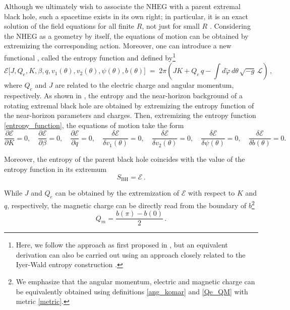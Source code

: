 \documentclass[11pt]{article}
\numberwithin{equation}{section} %
\begin{document}
Although we ultimately wish to associate the NHEG   {with}  a parent extremal black hole, such a spacetime exists   {in its own right;}  in particular, it   {is an exact solution of the field equations}  for all finite   {\(R\)}, not just for small   {\(R\) \cite{Sen:2007qy}}. Considering the NHEG as a geometry by itself, the equations of motion can be obtained by extremizing the corresponding action. Moreover, one can introduce a new functional \cite{Sen:2005iz,Astefanesei:2006dd}, called the entropy function and defined by\footnote{Here, we follow the approach as first proposed in \cite{Sen:2005iz,Astefanesei:2006dd}, but an equivalent derivation can also be carried out using  {an approach closely related to}  the Iyer-Wald entropy construction \cite{Compere:2015mza,Compere:2015bca,Hajian:2013lna}.}
%
\begin{equation}
    \mathcal{E}\!\bigl[J,Q_e,K,\beta,q,
                 v_{1}(\theta),v_{2}(\theta),
                \psi(\theta),b(\theta)\bigr]
  \;=\;
  2\pi\!\left(
          J K
          + Q_e\, q -\int d \tilde{\varphi}\,d \theta\,\sqrt{-g}\,\mathcal{L}
        \right)\,, \label{entropy_function}
 \end{equation}
where $Q_e$ and $J$ are related to the electric charge and angular momentum, respectively. As shown in   {\cite{Astefanesei:2006dd,Sen:2005iz,Astefanesei:2007bf}}, the entropy and the near-horizon background of a rotating extremal black hole are obtained by extremizing the entropy function of the near-horizon parameters and charges.   {Then, extremizing the entropy function \eqref{entropy_function},}  the equations of motion take the form
%
\begin{equation}
    \frac{\partial\mathcal{E}}{\partial K}=0,\quad
\frac{\partial\mathcal{E}}{\partial\beta}=0,\quad
\frac{\partial\mathcal{E}}{\partial q}=0,\quad
\frac{\delta\mathcal{E}}{\delta v_{1}(\theta)}=0,\quad
\frac{\delta\mathcal{E}}{\delta v_{2}(\theta)}=0,\quad
\frac{\delta\mathcal{E}}{\delta \psi(\theta)}=0,\quad
\frac{\delta\mathcal{E}}{\delta b(\theta)}=0.
\label{varE}
\end{equation}

Moreover, the entropy of the parent black hole coincides with the value of the entropy function in its extremum   {\cite{Astefanesei:2006dd,Sen:2005iz,Astefanesei:2007bf}}
\begin{equation}
    S_{\text{BH}}=\mathcal{E}\,.
\end{equation}

While $J$ and $Q_e$ can be obtained by the extremization of $\mathcal{E}$ with respect to $K$ and $q$, respectively, the magnetic charge can be directly read from the boundary of $b$\footnote{We emphasize that the angular momentum, electric and magnetic charge can be equivalently obtained using definitions \eqref{ang_komar} and \eqref{Qe_QM} with metric \eqref{metric}.}
%
\begin{equation} \label{magnetic_charge}
     Q_m=\dfrac{b(\pi)-b(0)}{2}\,.
\end{equation}
\end{document}
